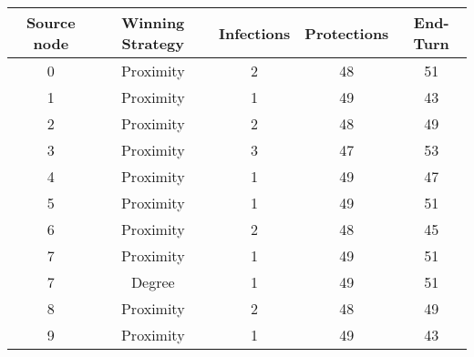 \documentclass[results.tex]{subfiles}
\begin{document}
    \begin{center}
        \begin{tabular}{| c || c | c | c | c |}
            \hline
            {\bfseries Source node} & {\bfseries Winning Strategy} & {\bfseries Infections} & {\bfseries Protections}
            & {\bfseries End-Turn}
            \\  %
            \hline\hline
            0                       & Proximity                    & 2                      & 48                      & 51                   \\
            \hline
            1                       & Proximity                    & 1                      & 49                      & 43                   \\
            \hline
            2                       & Proximity                    & 2                      & 48                      & 49                   \\
            \hline
            3                       & Proximity                    & 3                      & 47                      & 53                   \\
            \hline
            4                       & Proximity                    & 1                      & 49                      & 47                   \\
            \hline
            5                       & Proximity                    & 1                      & 49                      & 51                   \\
            \hline
            6                       & Proximity                    & 2                      & 48                      & 45                   \\
            \hline
            7                       & Proximity                    & 1                      & 49                      & 51                   \\
            \hline
            7                       & Degree                       & 1                      & 49                      & 51                   \\
            \hline
            8                       & Proximity                    & 2                      & 48                      & 49                   \\
            \hline
            9                       & Proximity                    & 1                      & 49                      & 43                   \\

\end{tabular}
\end{center}
\end{document}
